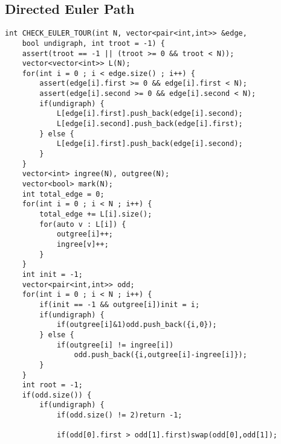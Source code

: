 \documentclass[landscape, 8pt, a4paper, oneside]{extarticle}
\begin{document}
\begin{multicols}{3}
\subsection{Directed Euler Path}
\begin{verbatim}
int CHECK_EULER_TOUR(int N, vector<pair<int,int>> &edge, 
    bool undigraph, int troot = -1) {
    assert(troot == -1 || (troot >= 0 && troot < N));
    vector<vector<int>> L(N);
    for(int i = 0 ; i < edge.size() ; i++) {
        assert(edge[i].first >= 0 && edge[i].first < N);
        assert(edge[i].second >= 0 && edge[i].second < N);
        if(undigraph) {
            L[edge[i].first].push_back(edge[i].second);
            L[edge[i].second].push_back(edge[i].first);
        } else {
            L[edge[i].first].push_back(edge[i].second);
        }
    }
    vector<int> ingree(N), outgree(N);
    vector<bool> mark(N);
    int total_edge = 0;
    for(int i = 0 ; i < N ; i++) {
        total_edge += L[i].size();
        for(auto v : L[i]) {
            outgree[i]++;
            ingree[v]++;
        }
    }
    int init = -1;
    vector<pair<int,int>> odd;
    for(int i = 0 ; i < N ; i++) {
        if(init == -1 && outgree[i])init = i;
        if(undigraph) {
            if(outgree[i]&1)odd.push_back({i,0});
        } else {
            if(outgree[i] != ingree[i])
                odd.push_back({i,outgree[i]-ingree[i]});
        }
    }
    int root = -1;
    if(odd.size()) {
        if(undigraph) {
            if(odd.size() != 2)return -1;

            if(odd[0].first > odd[1].first)swap(odd[0],odd[1]);


\end{verbatim}
\end{multicols}
\end{document}
